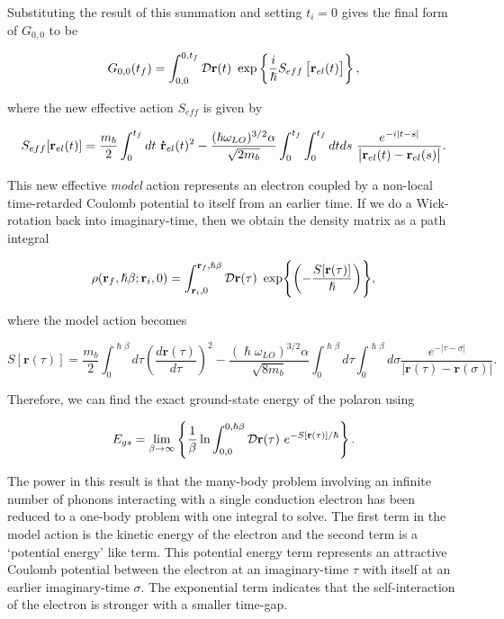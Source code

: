 Substituting the result of this summation and setting $t_i = 0$  gives the final form of $G_{0,0}$ to be

\begin{equation}
    G_{0,0}(t_f) = \int^{0, t_f}_{0, 0} \mathcal{D}\vb{r}(t)\ \exp\left\{ \frac{i}{\hslash} S_{eff} \left[\vb{r}_{el}(t)\right] \right\},
\end{equation}

where the new effective action $S_{eff}$ is given by

\begin{equation}
     S_{eff}[\vb{r}_{el}(t)] = \frac{m_b}{2} \int^{t_f}_{0} dt\ \vb{\dot{r}}_{el}(t)^2 -\frac{ (\hslash \omega_{LO})^{3/2} \alpha}{\sqrt{2 m_b}} \int_{0}^{t_f} \int_{0}^{t_f} dt ds\ \frac{e^{-i\abs{t-s}}}{\abs{\vb{r}_{el}(t) - \vb{r}_{el}(s)}}.
\end{equation}

This new effective \emph{model} action represents an electron coupled by a non-local time-retarded Coulomb potential to itself from an earlier time. If we do a Wick-rotation back into imaginary-time, then we obtain the density matrix as a path integral

\begin{equation}
    \rho(\vb{r}_{f}, \hslash\beta; \vb{r}_{i}, 0) = \int_{\vb{r}_i, 0}^{\vb{r}_f, \hslash\beta} \mathcal{D} \vb{r}(\tau)\ \exp{\left(-\frac{S[\mathbf{r}(\tau)]}{\hslash}\right)},
\label{eqn:path_density}
\end{equation}

where the model action becomes

\begin{equation}
    S[\mathbf{r}(\tau)] = \frac{m_b}{2}\int^{\hslash\beta}_0 d\tau \left(\frac{d\mathbf{r}(\tau)}{d\tau}\right)^2 - \frac{ (\hslash \omega_{LO})^{3/2} \alpha}{\sqrt{8 m_b}} \int^{\hslash\beta}_0 d\tau \int^{\hslash\beta}_0 d\sigma \frac{e^{-|\tau - \sigma|}}{|\mathbf{r}(\tau) - \mathbf{r}(\sigma)|} .
\label{eqn:athermal_model_action}
\end{equation}

Therefore, we can find the exact ground-state energy of the polaron using

\begin{equation}
    E_{gs} = \lim_{\beta \to \infty} \left\{ \frac{1}{\beta} \ln \int_{0, 0}^{0, \hslash\beta} \mathcal{D}\vb{r}(\tau)\ e^{-S[\vb{r}(\tau)]/\hslash} \right\}.
\end{equation}

The power in this result is that the many-body problem involving an infinite number of phonons interacting with a single conduction electron has been reduced to a one-body problem with one integral to solve. The first term in the model action is the kinetic energy of the electron and the second term is a `potential energy' like term. This potential energy term represents an attractive Coulomb potential between the electron at an imaginary-time $\tau$ with itself at an earlier imaginary-time $\sigma$. The exponential term indicates that the self-interaction of the electron is stronger with a smaller time-gap.

